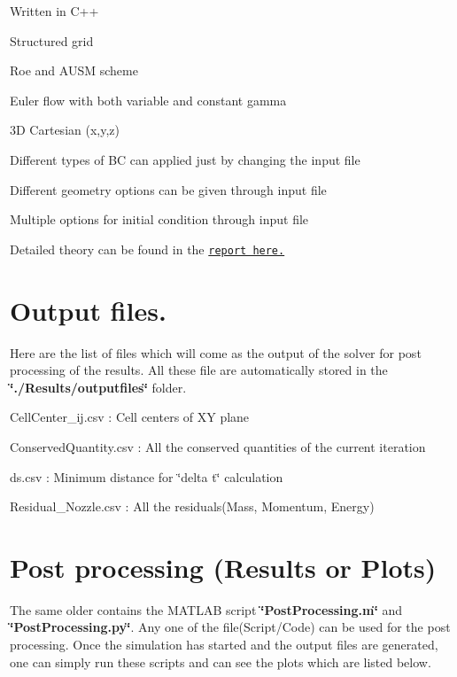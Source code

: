 \begin{DoxyItemize}
\item Written in C++
\item Structured grid
\item Roe and A\+U\+SM scheme
\item Euler flow with both variable and constant gamma
\item 3D Cartesian (x,y,z)
\item Different types of BC can applied just by changing the input file
\item Different geometry options can be given through input file
\item Multiple options for initial condition through input file
\item Detailed theory can be found in the \href{https://drive.google.com/open?id=0B9x_nh0D_HhzMnBjc0w5MmJpcnc}{\tt report here.}
\end{DoxyItemize}\hypertarget{index_output}{}\section{Output files.}\label{index_output}
Here are the list of files which will come as the output of the solver for post processing of the results. All these file are automatically stored in the {\bfseries \char`\"{}./\+Results/outputfiles\char`\"{}} folder.
\begin{DoxyItemize}
\item Cell\+Center\+\_\+ij.\+csv \+: Cell centers of XY plane
\item Conserved\+Quantity.\+csv \+: All the conserved quantities of the current iteration
\item ds.\+csv \+: Minimum distance for \char`\"{}delta t\char`\"{} calculation
\item Residual\+\_\+\+Nozzle.\+csv \+: All the residuals(\+Mass, Momentum, Energy)
\end{DoxyItemize}\hypertarget{index_plot}{}\section{Post processing (\+Results or Plots)}\label{index_plot}
The same older contains the M\+A\+T\+L\+AB script {\bfseries \char`\"{}\+Post\+Processing.\+m\char`\"{}} and {\bfseries \char`\"{}\+Post\+Processing.\+py\char`\"{}}. Any one of the file(Script/\+Code) can be used for the post processing. Once the simulation has started and the output files are generated, one can simply run these scripts and can see the plots which are listed below.
